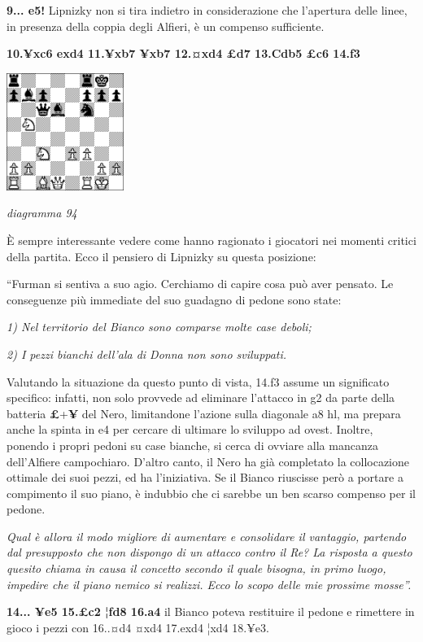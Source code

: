 \documentclass[
]{article}
\begin{document}
\textbf{9... e5!} Lipnizky non si tira indietro in considerazione che
l'apertura delle linee, in presenza della coppia degli Alfieri, è un
compenso sufficiente.

\textbf{10.¥xc6 exd4 11.¥xb7 ¥xb7 12.¤xd4 £d7 13.Cdb5 £c6 14.f3}

\includegraphics[width=1.5in,height=1.5in]{vertopal_109f12be458a423d8f3cc838880eaea2/media/image94.png}

\emph{diagramma 94}

È sempre interessante vedere come hanno ragionato i giocatori nei
momenti critici della partita. Ecco il pensiero di Lipnizky su questa
posizione:

``Furman si sentiva a suo agio. Cerchiamo di capire cosa può aver
pensato. Le conseguenze più immediate del suo guadagno di pedone sono
state:

\emph{1) Nel territorio del Bianco sono comparse molte case deboli;}

\emph{2) I pezzi bianchi dell'ala di Donna non sono sviluppati.}

Valutando la situazione da questo punto di vista, 14.f3 assume un
significato specifico: infatti, non solo provvede ad eliminare l'attacco
in g2 da parte della batteria \textbf{£}+\textbf{¥} del Nero,
limitandone l'azione sulla diagonale a8 hl, ma prepara anche la spinta
in e4 per cercare di ultimare lo sviluppo ad ovest. Inoltre, ponendo i
propri pedoni su case bianche, si cerca di ovviare alla mancanza
dell'Alfiere campochiaro. D'altro canto, il Nero ha già completato la
collocazione ottimale dei suoi pezzi, ed ha l'iniziativa. Se il Bianco
riuscisse però a portare a compimento il suo piano, è indubbio che ci
sarebbe un ben scarso compenso per il pedone.

\emph{Qual è allora il modo migliore di aumentare e consolidare il
vantaggio, partendo dal presupposto che non dispongo di un attacco
contro il Re? La risposta a questo quesito chiama in causa il concetto
secondo il quale bisogna, in primo luogo, impedire che il piano nemico
si realizzi. Ecco lo scopo delle mie prossime mosse''.}

\textbf{14... ¥e5 15.£c2 ¦fd8 16.a4} il Bianco poteva restituire il
pedone e rimettere in gioco i pezzi con 16..¤d4 ¤xd4 17.exd4 ¦xd4
18.¥e3.
\end{document}
